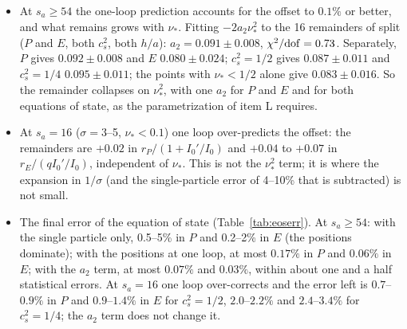 \documentclass[11pt,aps,preprint,nofootinbib,superscriptaddress,tightenlines]{revtex4-2}
\def\Tab#1{Table~\ref{#1}}
\begin{document}
\begin{itemize}
\item At $s_a\ge54$ the one-loop prediction accounts for the offset to $0.1\%$ or better, and what remains grows with $\nu_*$.  Fitting
  $-2a_2\nu_*^2$ to the 16 remainders of split ($P$ and $E$, both $c_s^2$, both $h/a$): $a_2=0.091\pm0.008$, $\chi^2/{\rm dof}=0.73$.  Separately,
  $P$ gives $0.092\pm0.008$ and $E$ $0.080\pm0.024$; $c_s^2=1/2$ gives $0.087\pm0.011$ and $c_s^2=1/4$ $0.095\pm0.011$; the points with
  $\nu_*<1/2$ alone give $0.083\pm0.016$.  So the remainder collapses on $\nu_*^2$, with one $a_2$ for $P$ and $E$ and for both equations of state, as
  the parametrization of item L requires.
\item At $s_a=16$ ($\sigma=3$--5, $\nu_*<0.1$) one loop over-predicts the offset: the remainders are $+0.02$ in $r_P/(1+I_0'/I_0)$ and $+0.04$ to
  $+0.07$ in $r_E/(qI_0'/I_0)$, independent of $\nu_*$.  This is not the $\nu_*^2$ term; it is where the expansion in $1/\sigma$ (and the single-particle
  error of 4--10\% that is subtracted) is not small.
\item The final error of the equation of state (\Tab{tab:eoserr}).  At $s_a\ge54$: with the single particle only, 0.5--5\% in $P$ and
  0.2--2\% in $E$ (the positions dominate); with the positions at one loop, at most $0.17\%$ in $P$ and $0.06\%$ in $E$; with the $a_2$ term, at most
  $0.07\%$ and $0.03\%$, within about one and a half statistical errors.  At $s_a=16$ one loop over-corrects and the error left is $0.7$--$0.9\%$ in
  $P$ and $0.9$--$1.4\%$ in $E$ for $c_s^2=1/2$, $2.0$--$2.2\%$ and $2.4$--$3.4\%$ for $c_s^2=1/4$; the $a_2$ term does not change it.
\end{itemize}
\end{document}
